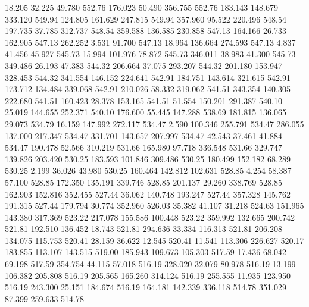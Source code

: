   18.205   32.225   49.780       552.76
 176.023   50.490  356.755       552.76
 183.143  148.679  333.120       549.94
 124.805  161.629  247.815       549.94
 357.960   95.522  220.496       548.54
 197.735   37.785  312.737       548.54
 359.588  136.585  230.858       547.13
 164.166   26.733  162.905       547.13
 262.252    3.531   91.700       547.13
  18.964  136.664  274.593       547.13
   4.837   41.456   45.927       545.73
  15.994  101.976   78.872       545.73
 346.011   38.983   41.300       545.73
 349.486   26.193   47.383       544.32
 206.664   37.075  293.207       544.32
 201.180  153.947  328.453       544.32
 341.554  146.152  224.641       542.91
 184.751  143.614  321.615       542.91
 173.712  134.484  339.068       542.91
 210.026   58.332  319.062       541.51
 343.354  140.305  222.680       541.51
 160.423   28.378  153.165       541.51
  51.554  150.201  291.387       540.10
  25.019  144.655  252.371       540.10
 176.600   55.445  147.288       538.69
 181.815  136.065   29.073       534.79
  16.159  147.992  272.117       534.47
   2.590  100.346  255.791       534.47
 286.055  137.000  217.347       534.47
 331.701  143.657  207.997       534.47
  42.543   37.461   41.884       534.47
 190.478   52.566  310.219       531.66
 165.980   97.718  336.548       531.66
 329.747  139.826  203.420       530.25
 183.593  101.846  309.486       530.25
 180.499  152.182   68.289       530.25
   2.199   36.026   43.980       530.25
 160.464  142.812  102.631       528.85
   4.254   58.387   57.100       528.85
 172.350  135.191  339.746       528.85
 201.137   29.260  338.769       528.85
 162.903  152.816  352.455       527.44
  36.062  140.748  193.247       527.44
 357.328  145.762  191.315       527.44
 179.794   30.774  352.960       526.03
  35.382   41.107   31.218       524.63
 151.965  143.380  317.369       523.22
 217.078  155.586  100.448       523.22
 359.992  132.665  200.742       521.81
 192.510  136.452   18.743       521.81
 294.636   33.334  116.313       521.81
 206.208  134.075  115.753       520.41
  28.159   36.622   12.545       520.41
  11.541  113.306  226.627       520.17
 183.855  113.107  143.515       519.00
 185.943  109.673  105.303       517.59
  17.436   68.042   69.198       517.59
 354.754   44.115   57.018       516.19
 328.020   32.079   80.978       516.19
  13.199  106.382  205.808       516.19
 205.565  165.260  314.124       516.19
 255.555   11.935  123.950       516.19
 243.300   25.151  184.674       516.19
 164.181  142.339  336.118       514.78
 351.029   87.399  259.633       514.78
